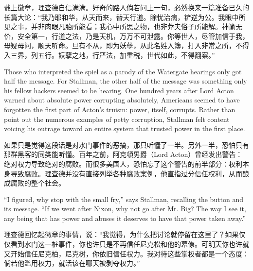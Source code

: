 \ifdefined\chs
戴上徽章，理查德自信满满。好奇的路人倘若问上一句，必然换来一篇准备已久的长篇大论：``我乃耶和华，从天而来，替天行道。除忧治病，铲逆为公。我眼中所见之事，并非肉眼凡胎所能看；我心中所思之物，也非莽夫俗子所能解。神谕无价，安全第一，行道之法，乃是天机，万万不可泄露。你等世人，尽管加信于我，毋疑毋问，顺天听命。旦有不从，即为妖孽，从此名姓入簿，打入非常之所，不得入三界，列五行。妖孽之地，行严法，加重税，世代如此，不得翻案。''
\fi

\ifdefined\eng
Those who interpreted the spiel as a parody of the Watergate hearings only got half the message. For Stallman, the other half of the message was something only his fellow hackers seemed to be hearing. One hundred years after Lord Acton warned about absolute power corrupting absolutely, Americans seemed to have forgotten the first part of Acton's truism: power, itself, corrupts. Rather than point out the numerous examples of petty corruption, Stallman felt content voicing his outrage toward an entire system that trusted power in the first place.
\fi

\ifdefined\chs
如果只是觉得这段话是对水门事件的恶搞，那只听懂了一半。另外一半，恐怕只有那群黑客的同类能听懂。百年之前，阿克頓男爵（Lord Acton）曾经发出警告：绝对权力导致绝对的腐败。而很多美国人，恐怕忘了这个警告的前半部分：权利本身导致腐败。理查德并没有直接列举各种腐败案例，他直指过分信任权利，从而酿成腐败的整个社会。
\fi

\ifdefined\eng
``I figured, why stop with the small fry,'' says Stallman, recalling the button and its message. ``If we went after Nixon, why not go after Mr. Big? The way I see it, any being that has power and abuses it deserves to have that power taken away.''
\fi

\ifdefined\chs
理查德回忆起徽章的事情，说：``我觉得，为什么把讨论就停留在这里了？如果仅仅看到水门这一桩事件，你也许只是不再信任尼克松和他的幕僚。可明天你也许就又开始信任尼克柏，尼克树，你依旧信任权力。我对待这些掌权者都是一个态度：倘若他滥用权力，就活该在哪天被剥夺权力。''
\fi

\theendnotes
\setcounter{endnote}{0}
